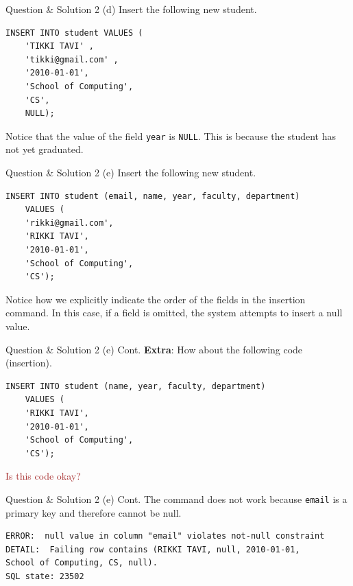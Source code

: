 \begin{frame}[fragile]{Question \& Solution 2 (d)}
Insert the following new student.

\begin{lstlisting}
INSERT INTO student VALUES (
	'TIKKI TAVI' , 
	'tikki@gmail.com' , 
	'2010-01-01', 
	'School of Computing', 
	'CS', 
	NULL);
\end{lstlisting}

Notice that the value of the field \texttt{year} is \texttt{NULL}. This is because the student has not yet graduated.
\end{frame}

\begin{frame}[fragile]{Question \& Solution 2 (e)}
Insert the following new student.

\begin{lstlisting}
INSERT INTO student (email, name, year, faculty, department)
	VALUES (
	'rikki@gmail.com', 
	'RIKKI TAVI', 
	'2010-01-01',
	'School of Computing', 
	'CS');
\end{lstlisting}

Notice how we explicitly indicate the order of the fields in the insertion command. In this case, if a field is omitted, the system attempts to insert a null value.

\end{frame}

\begin{frame}[fragile]{Question \& Solution 2 (e) Cont.}
\textbf{Extra}: How about the following code (insertion).
\begin{lstlisting}
INSERT INTO student (name, year, faculty, department) 
	VALUES (
	'RIKKI TAVI',  
	'2010-01-01', 
	'School of Computing', 
	'CS');
\end{lstlisting}

\textcolor{brown}{Is this code okay?}
\end{frame}

\begin{frame}[fragile]{Question \& Solution 2 (e) Cont.}
The command does not work because \texttt{email} is a primary key and therefore cannot be null.

\begin{lstlisting}[style=error]
ERROR:  null value in column "email" violates not-null constraint
DETAIL:  Failing row contains (RIKKI TAVI, null, 2010-01-01, 
School of Computing, CS, null).
SQL state: 23502
\end{lstlisting}
\end{frame}


